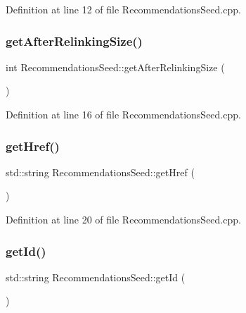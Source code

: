 Definition at line 12 of file Recommendations\+Seed.\+cpp.

\mbox{\label{class_recommendations_seed_ae50b0b01f49abf93f8ebdfa3c789fc54}} 
\subsubsection{\texorpdfstring{get\+After\+Relinking\+Size()}{getAfterRelinkingSize()}}
{\footnotesize\ttfamily int Recommendations\+Seed\+::get\+After\+Relinking\+Size (\begin{DoxyParamCaption}{ }\end{DoxyParamCaption})}



Definition at line 16 of file Recommendations\+Seed.\+cpp.

\mbox{\label{class_recommendations_seed_ae5c119d327f2531da8bb0cccba4bec67}} 
\subsubsection{\texorpdfstring{get\+Href()}{getHref()}}
{\footnotesize\ttfamily std\+::string Recommendations\+Seed\+::get\+Href (\begin{DoxyParamCaption}{ }\end{DoxyParamCaption})}



Definition at line 20 of file Recommendations\+Seed.\+cpp.

\mbox{\label{class_recommendations_seed_ad93af1864849b40cb7dee96cf8a434c4}} 
\subsubsection{\texorpdfstring{get\+Id()}{getId()}}
{\footnotesize\ttfamily std\+::string Recommendations\+Seed\+::get\+Id (\begin{DoxyParamCaption}{ }\end{DoxyParamCaption})}




